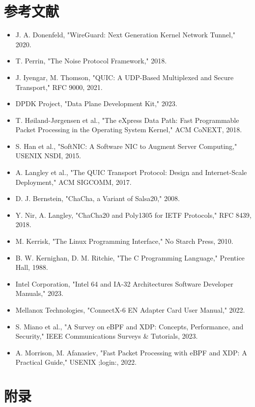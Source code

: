 \chapter{参考文献}
\begin{itemize}
\item J. A. Donenfeld, "WireGuard: Next Generation Kernel Network Tunnel," 2020.
\item T. Perrin, "The Noise Protocol Framework," 2018.
\item J. Iyengar, M. Thomson, "QUIC: A UDP-Based Multiplexed and Secure Transport," RFC 9000, 2021.
\item DPDK Project, "Data Plane Development Kit," 2023.
\item T. Høiland-Jørgensen et al., "The eXpress Data Path: Fast Programmable Packet Processing in the Operating System Kernel," ACM CoNEXT, 2018.
\item S. Han et al., "SoftNIC: A Software NIC to Augment Server Computing," USENIX NSDI, 2015.
\item A. Langley et al., "The QUIC Transport Protocol: Design and Internet-Scale Deployment," ACM SIGCOMM, 2017.
\item D. J. Bernstein, "ChaCha, a Variant of Salsa20," 2008.
\item Y. Nir, A. Langley, "ChaCha20 and Poly1305 for IETF Protocols," RFC 8439, 2018.
\item M. Kerrisk, "The Linux Programming Interface," No Starch Press, 2010.
\item B. W. Kernighan, D. M. Ritchie, "The C Programming Language," Prentice Hall, 1988.
\item Intel Corporation, "Intel 64 and IA-32 Architectures Software Developer Manuals," 2023.
\item Mellanox Technologies, "ConnectX-6 EN Adapter Card User Manual," 2022.
\item S. Miano et al., "A Survey on eBPF and XDP: Concepts, Performance, and Security," IEEE Communications Surveys \&{} Tutorials, 2023.
\item A. Morrison, M. Afanasiev, "Fast Packet Processing with eBPF and XDP: A Practical Guide," USENIX ;login:, 2022.
\end{itemize}
\chapter{附录}
